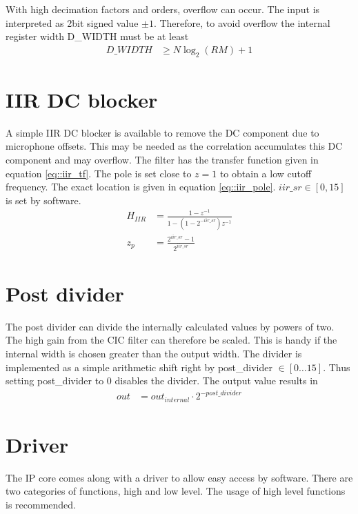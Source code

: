 With high decimation factors and orders, overflow can occur.
The input is interpreted as 2bit signed value $\pm1$. 
Therefore, to avoid overflow the internal register width D\_WIDTH must be at least
\begin{align}
D\_WIDTH &\ge N\log_2{(RM)} + 1 \label{eq::cic_width}
\end{align}

\section{IIR DC blocker}
\label{sec::iir}
A simple IIR DC blocker is available to remove the DC component due to microphone offsets.
This may be needed as the correlation accumulates this DC component and may overflow.
The filter has the transfer function given in equation \ref{eq::iir_tf}.
The pole is set close to $z=1$ to obtain a low cutoff frequency.
The exact location is given in equation \ref{eq::iir_pole}.
$iir\_sr\in\left[0,15\right]$ is set by software.
\begin{align}
	H_{IIR} &= \frac{1-z^{-1}}{1-\left(1-2^{-iir\_sr}\right)z^{-1}} \label{eq::iir_tf}\\
	z_p &= \frac{2^{iir\_sr}-1}{2^{iir\_sr}} \label{eq::iir_pole}
\end{align}

\section{Post divider}
\label{sec::post_divider}

The post divider can divide the internally calculated values by powers of two.
The high gain from the CIC filter can therefore be scaled.
This is handy if the internal width is chosen greater than the output width.
The divider is implemented as a simple arithmetic shift right by post\_divider $\in\left[0\ldots15\right]$.
Thus setting post\_divider to 0 disables the divider.
The output value results in
\begin{align}
	out &= out_{internal}\cdot2^{-post\_divider}
\end{align}

\section{Driver}
\label{sec::driver}

The IP core comes along with a driver to allow easy access by software.
There are two categories of functions, high and low level.
The usage of high level functions is recommended.

